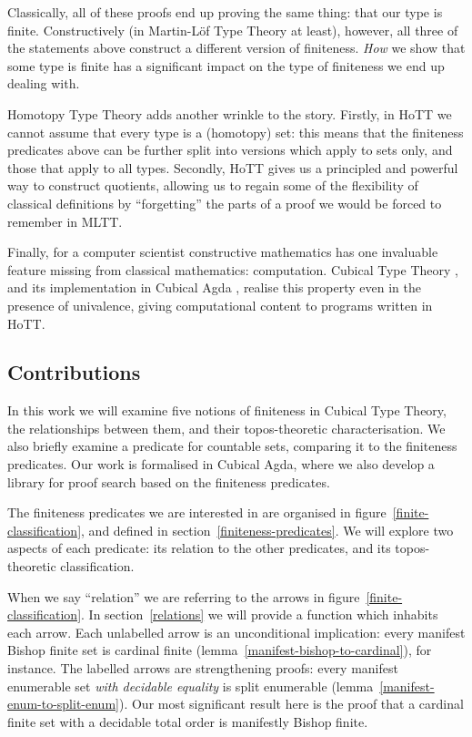 Classically, all of these proofs end up proving the same thing: that our type is
finite.
Constructively (in Martin-Löf Type Theory
\cite{martin-lofIntuitionisticTypeTheory1980} at least), however, all three
of the statements above construct a different version of finiteness.
\emph{How} we show that some type is finite has a significant impact on the
type of finiteness we end up dealing with.

Homotopy Type Theory \cite{hottbook} adds another wrinkle to the story.
Firstly, in HoTT we cannot assume that every type is a (homotopy) set: this
means that the finiteness predicates above can be further split into versions
which apply to sets only, and those that apply to all types.
Secondly, HoTT gives us a principled and powerful way to construct quotients,
allowing us to regain some of the flexibility of classical definitions by
``forgetting'' the parts of a proof we would be forced to remember in MLTT.

Finally, for a computer scientist constructive mathematics has one invaluable
feature missing from classical mathematics: computation.
Cubical Type Theory \cite{cohenCubicalTypeTheory2016}, and its implementation in
Cubical Agda \cite{vezzosiCubicalAgdaDependently2019}, realise this property
even in the presence of univalence, giving computational content to programs
written in HoTT.
\subsection{Contributions}
In this work we will examine five notions of finiteness in Cubical Type Theory,
the relationships between them, and their topos-theoretic characterisation.
We also briefly examine a predicate for countable sets, comparing it to the
finiteness predicates.
Our work is formalised in Cubical Agda, where we also develop a library for
proof search based on the finiteness predicates.



The finiteness predicates we are interested in are organised in
figure~\ref{finite-classification}, and defined in
section~\ref{finiteness-predicates}.
We will explore two aspects of each predicate: its relation to the other
predicates, and its topos-theoretic classification.

When we say ``relation'' we are referring to the arrows in
figure~\ref{finite-classification}.
In section~\ref{relations} we will provide a function which inhabits each arrow.
Each unlabelled arrow is an unconditional implication: every manifest Bishop
finite set is cardinal finite (lemma~\ref{manifest-bishop-to-cardinal}), for
instance.
The labelled arrows are strengthening proofs: every manifest enumerable set
\emph{with decidable equality} is split enumerable
(lemma~\ref{manifest-enum-to-split-enum}).
Our most significant result here is the proof that a cardinal finite set with a
decidable total order is manifestly Bishop finite.

